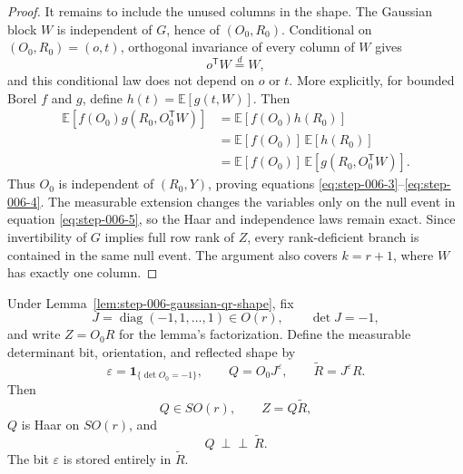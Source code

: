 \begin{proof}
It remains to include the unused columns in the shape. The Gaussian block
\(W\) is independent of \(G\), hence of \((O_0,R_0)\). Conditional on
\((O_0,R_0)=(o,t)\), orthogonal invariance of every column of \(W\) gives
\begin{equation}
  o^{\mathsf T}W\stackrel d=W,                                \label{eq:step-006-10}
\end{equation}
and this conditional law does not depend on \(o\) or \(t\). More explicitly,
for bounded Borel \(f\) and \(g\), define
\(h(t)=\mathbb E[g(t,W)]\). Then
\begin{equation}
\begin{aligned}
  \mathbb E[f(O_0)g(R_0,O_0^{\mathsf T}W)]
  &=\mathbb E[f(O_0)h(R_0)]\\
  &=\mathbb E[f(O_0)]\,\mathbb E[h(R_0)]\\
  &=\mathbb E[f(O_0)]\,
    \mathbb E[g(R_0,O_0^{\mathsf T}W)].
\end{aligned}\label{eq:step-006-11}
\end{equation}
Thus \(O_0\) is independent of \((R_0,Y)\), proving equations \eqref{eq:step-006-3}--\eqref{eq:step-006-4}. The
measurable extension changes the variables only on the null event in equation
\eqref{eq:step-006-5}, so the Haar and independence laws remain exact. Since invertibility of
\(G\) implies full row rank of \(Z\), every rank-deficient branch is contained
in the same null event. The argument also covers \(k=r+1\), where \(W\) has
exactly one column.


\end{proof}


\begin{proposition}
\label{prop:step-006-reflection-absorption}
Under Lemma~\ref{lem:step-006-gaussian-qr-shape}, fix
\[
  J=\operatorname{diag}(-1,1,\ldots,1)\in O(r),
  \qquad \det J=-1,
\]
and write \(Z=O_0R\) for the lemma's factorization. Define the measurable
determinant bit, orientation, and reflected shape by
\begin{equation}
  \varepsilon=\mathbf 1_{\{\det O_0=-1\}},\qquad
  Q=O_0J^{\varepsilon},\qquad
  \widetilde R=J^{\varepsilon}R.                              \label{eq:step-006-12}
\end{equation}
Then
\begin{equation}
  Q\in SO(r),\qquad Z=Q\widetilde R,                           \label{eq:step-006-13}
\end{equation}
\(Q\) is Haar on \(SO(r)\), and
\begin{equation}
  Q\ \perp\!\!\!\perp\ \widetilde R.                       \label{eq:step-006-14}
\end{equation}
The bit \(\varepsilon\) is stored entirely in \(\widetilde R\).

\end{proposition}


